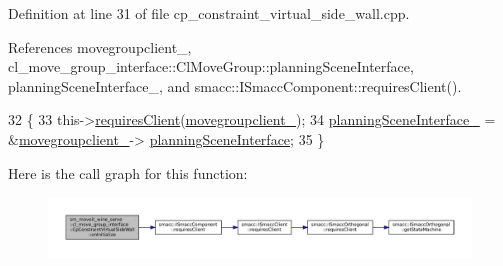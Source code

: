 Definition at line 31 of file cp\+\_\+constraint\+\_\+virtual\+\_\+side\+\_\+wall.\+cpp.



References movegroupclient\+\_\+, cl\+\_\+move\+\_\+group\+\_\+interface\+::\+Cl\+Move\+Group\+::planning\+Scene\+Interface, planning\+Scene\+Interface\+\_\+, and smacc\+::\+I\+Smacc\+Component\+::requires\+Client().


\begin{DoxyCode}
32         \{
33             this->\hyperlink{classsmacc_1_1ISmaccComponent_a36c085d906fbae0fcaee817aaeafebf4}{requiresClient}(\hyperlink{classsm__moveit__wine__serve_1_1cl__move__group__interface_1_1CpConstraintVirtualSideWall_ab25adb3d9fa43c9b9bfbad41379b7247}{movegroupclient\_});
34             \hyperlink{classsm__moveit__wine__serve_1_1cl__move__group__interface_1_1CpConstraintVirtualSideWall_ae3bb8a018ebf8b85621e23f4093a07e9}{planningSceneInterface\_} = &\hyperlink{classsm__moveit__wine__serve_1_1cl__move__group__interface_1_1CpConstraintVirtualSideWall_ab25adb3d9fa43c9b9bfbad41379b7247}{movegroupclient\_}->
      \hyperlink{classcl__move__group__interface_1_1ClMoveGroup_a11bfab580f36e2ad32c9b37d6f58f44c}{planningSceneInterface};
35         \}
\end{DoxyCode}
Here is the call graph for this function\+:
\nopagebreak
\begin{figure}[H]
\begin{center}
\leavevmode
\includegraphics[width=350pt]{classsm__moveit__wine__serve_1_1cl__move__group__interface_1_1CpConstraintVirtualSideWall_a834e3d1e6b683cbacfaafc40847df9fa_cgraph}
\end{center}
\end{figure}
\mbox{\label{classsm__moveit__wine__serve_1_1cl__move__group__interface_1_1CpConstraintVirtualSideWall_a7cdb83affb53be16e9d2961aa8361e22}} 
